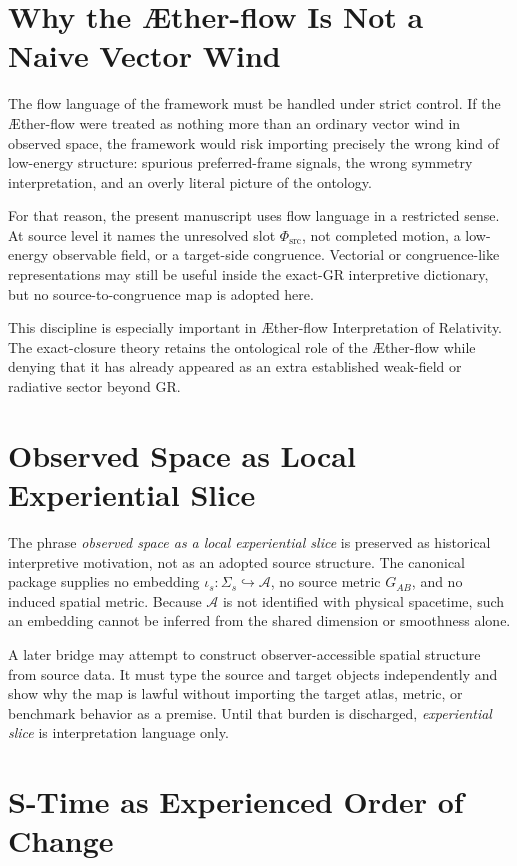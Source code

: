 \documentclass[11pt]{article}
\newcommand{\Aflow}{\AE{}ther-flow}
\newcommand{\TheoryName}{\Aflow{} Interpretation of Relativity}
\newcommand{\Sub}{\mathcal{A}}
\newcommand{\PhiSrc}{\Phi_{\mathrm{src}}}
\begin{document}
\section{Why the \Aflow{} Is Not a Naive Vector Wind}

The flow language of the framework must be handled under strict control. If the \Aflow{} were treated as nothing more than an ordinary vector wind in observed space, the framework would risk importing precisely the wrong kind of low-energy structure: spurious preferred-frame signals, the wrong symmetry interpretation, and an overly literal picture of the ontology.

For that reason, the present manuscript uses flow language in a restricted
sense. At source level it names the unresolved slot \(\PhiSrc\), not completed
motion, a low-energy observable field, or a target-side congruence. Vectorial
or congruence-like representations may still be useful inside the exact-GR
interpretive dictionary, but no source-to-congruence map is adopted here.

This discipline is especially important in \TheoryName{}. The exact-closure theory retains the ontological role of the \Aflow{} while denying that it has already appeared as an extra established weak-field or radiative sector beyond GR.

\section{Observed Space as Local Experiential Slice}

The phrase \emph{observed space as a local experiential slice} is preserved as
historical interpretive motivation, not as an adopted source structure. The
canonical package supplies no embedding
\(\iota_s:\Sigma_s\hookrightarrow\Sub\), no source metric \(G_{AB}\), and no
induced spatial metric. Because \(\Sub\) is not identified with physical
spacetime, such an embedding cannot be inferred from the shared dimension or
smoothness alone.

A later bridge may attempt to construct observer-accessible spatial structure
from source data. It must type the source and target objects independently and
show why the map is lawful without importing the target atlas, metric, or
benchmark behavior as a premise. Until that burden is discharged,
\emph{experiential slice} is interpretation language only.

\section{S-Time as Experienced Order of Change}
\end{document}
